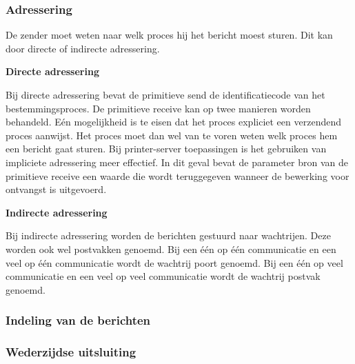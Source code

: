 \subsubsection{Adressering}

De zender moet weten naar welk proces hij het bericht moest sturen. Dit kan door directe of indirecte adressering.

\textbf{Directe adressering}

Bij directe adressering bevat de primitieve send de identificatiecode van het bestemmingsproces. De primitieve receive kan op twee manieren worden behandeld. Eén mogelijkheid is te eisen dat het proces expliciet een verzendend proces aanwijst. Het proces moet dan wel van te voren weten welk proces hem een bericht gaat sturen. Bij printer-server toepassingen is het gebruiken van impliciete adressering meer effectief. In dit geval bevat de parameter bron van de primitieve receive een waarde die wordt teruggegeven wanneer de bewerking voor ontvangst is uitgevoerd.

\textbf{Indirecte adressering}

Bij indirecte adressering worden de berichten gestuurd naar wachtrijen. Deze worden ook wel postvakken genoemd. Bij een één op één communicatie en een veel op één communicatie wordt de wachtrij poort genoemd. Bij een één op veel communicatie en een veel op veel communicatie wordt de wachtrij postvak genoemd.

\subsubsection{Indeling van de berichten}

\subsubsection{Wederzijdse uitsluiting}

